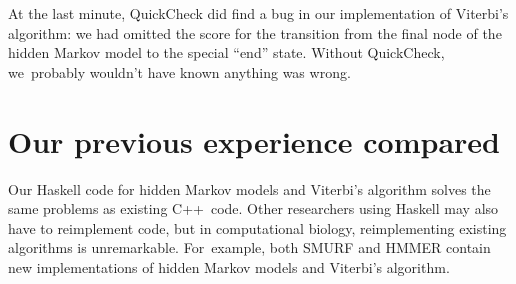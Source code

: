 \documentclass[preprint,nonatbib,blockstyle,times]{sigplanconf}
\newcommand\seclabel[1]{\label{sec:#1}}
\begin{document}
At the last minute, QuickCheck did find
a bug in our implementation of Viterbi's algorithm: we had omitted
the score for the transition from the final node of the hidden
Markov model to the special ``end'' state.
Without QuickCheck, we~probably wouldn't have known anything was wrong.



 
 
\section{Our previous experience compared}
\seclabel{comparo}

Our Haskell code for hidden Markov models and Viterbi's algorithm
solves the same problems as existing C++~code.
Other researchers using Haskell may also have to reimplement code,
but
in computational biology, reimplementing existing algorithms is unremarkable.
For~example, both SMURF and HMMER contain new implementations of
hidden Markov models and Viterbi's algorithm.
\end{document}
